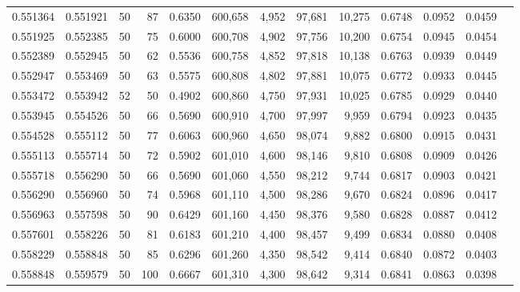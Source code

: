 \begin{tabular}{rrrrrrrrrrrrr}
0.551364 & 0.551921 &    50 &  87 &                                     0.6350 & 600,658 &   4,952 &  97,681 &  10,275 & 0.6748 & 0.0952 & 0.0459 \\
0.551925 & 0.552385 &    50 &  75 &                                     0.6000 & 600,708 &   4,902 &  97,756 &  10,200 & 0.6754 & 0.0945 & 0.0454 \\
0.552389 & 0.552945 &    50 &  62 &                                     0.5536 & 600,758 &   4,852 &  97,818 &  10,138 & 0.6763 & 0.0939 & 0.0449 \\
0.552947 & 0.553469 &    50 &  63 &                                     0.5575 & 600,808 &   4,802 &  97,881 &  10,075 & 0.6772 & 0.0933 & 0.0445 \\
0.553472 & 0.553942 &    52 &  50 &                                     0.4902 & 600,860 &   4,750 &  97,931 &  10,025 & 0.6785 & 0.0929 & 0.0440 \\
0.553945 & 0.554526 &    50 &  66 &                                     0.5690 & 600,910 &   4,700 &  97,997 &   9,959 & 0.6794 & 0.0923 & 0.0435 \\
0.554528 & 0.555112 &    50 &  77 &                                     0.6063 & 600,960 &   4,650 &  98,074 &   9,882 & 0.6800 & 0.0915 & 0.0431 \\
0.555113 & 0.555714 &    50 &  72 &                                     0.5902 & 601,010 &   4,600 &  98,146 &   9,810 & 0.6808 & 0.0909 & 0.0426 \\
0.555718 & 0.556290 &    50 &  66 &                                     0.5690 & 601,060 &   4,550 &  98,212 &   9,744 & 0.6817 & 0.0903 & 0.0421 \\
0.556290 & 0.556960 &    50 &  74 &                                     0.5968 & 601,110 &   4,500 &  98,286 &   9,670 & 0.6824 & 0.0896 & 0.0417 \\
0.556963 & 0.557598 &    50 &  90 &                                     0.6429 & 601,160 &   4,450 &  98,376 &   9,580 & 0.6828 & 0.0887 & 0.0412 \\
0.557601 & 0.558226 &    50 &  81 &                                     0.6183 & 601,210 &   4,400 &  98,457 &   9,499 & 0.6834 & 0.0880 & 0.0408 \\
0.558229 & 0.558848 &    50 &  85 &                                     0.6296 & 601,260 &   4,350 &  98,542 &   9,414 & 0.6840 & 0.0872 & 0.0403 \\
0.558848 & 0.559579 &    50 & 100 &                                     0.6667 & 601,310 &   4,300 &  98,642 &   9,314 & 0.6841 & 0.0863 & 0.0398 \\

\end{tabular}
